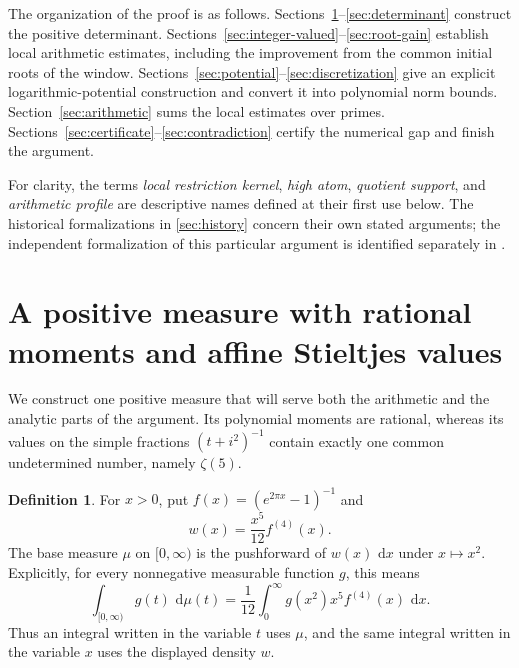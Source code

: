 \documentclass[11pt,letterpaper]{article}
\theoremstyle{definition}
\newtheorem{definition}[definition]{Definition}
\newcommand{\dd}{\,\mathrm d}
\begin{document}
The organization of the proof is as follows. Sections~\ref{sec:functional}--\ref{sec:determinant}
construct the positive determinant.
Sections~\ref{sec:integer-valued}--\ref{sec:root-gain} establish local
arithmetic estimates, including the improvement from the common initial
roots of the window.
Sections~\ref{sec:potential}--\ref{sec:discretization} give an explicit
logarithmic-potential construction and convert it into polynomial norm
bounds.
Section~\ref{sec:arithmetic} sums the local estimates over primes.
Sections~\ref{sec:certificate}--\ref{sec:contradiction} certify the numerical
gap and finish the argument.

For clarity, the terms \emph{local restriction kernel}, \emph{high atom},
\emph{quotient support}, and \emph{arithmetic profile} are descriptive names
defined at their first use below. The historical formalizations in
\cref{sec:history} concern their own stated arguments; the independent
formalization of this particular argument is identified separately in
\cite{zeta5lean2026}.


\section{A positive measure with rational moments and affine Stieltjes values}\label{sec:functional}

We construct one positive measure that will serve both the arithmetic and
the analytic parts of the argument. Its polynomial moments are rational,
whereas its values on the simple fractions $(t+i^2)^{-1}$ contain exactly
one common undetermined number, namely $\zeta(5)$.

\begin{definition}\label{def:physical-measure}
For $x>0$, put $f(x)=(e^{2\pi x}-1)^{-1}$ and
\[
 w(x)=\frac{x^5}{12}f^{(4)}(x).
\]
The base measure $\mu$ on $[0,\infty)$ is the pushforward of
$w(x)\,\dd x$ under $x\mapsto x^2$. Explicitly, for every nonnegative
measurable function $g$, this means
\begin{equation}\label{eq:physical-measure}
 \int_{[0,\infty)}g(t)\,\dd\mu(t)
 =\frac1{12}\int_0^\infty g(x^2)x^5f^{(4)}(x)\,\dd x.
\end{equation}
Thus an integral written in the variable $t$ uses $\mu$, and the same
integral written in the variable $x$ uses the displayed density $w$.
\end{definition}
\end{document}
